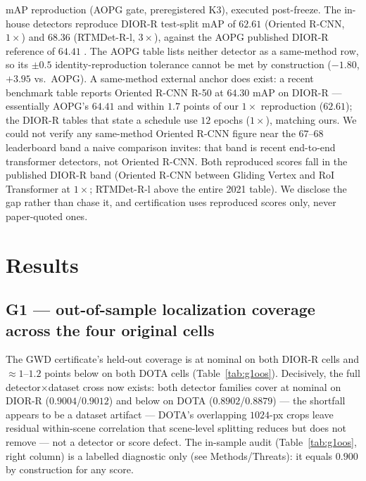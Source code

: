 \documentclass[11pt]{article}
\begin{document}
mAP reproduction (AOPG gate, preregistered K3), executed post-freeze. The in-house detectors reproduce
DIOR-R test-split mAP of $62.61$ (Oriented R-CNN, $1\times$) and $68.36$ (RTMDet-R-l, $3\times$), against the
AOPG published DIOR-R reference of $64.41$ \citep{cheng2022diorr}. The AOPG table lists neither detector as a
same-method row, so its $\pm0.5$ identity-reproduction tolerance cannot be met by construction ($-1.80$,
$+3.95$ vs.\ AOPG). A same-method external anchor does exist: a recent benchmark table reports Oriented R-CNN
R-50 at $64.30$ mAP on DIOR-R \citep{ding2026rtoriented} --- essentially AOPG's $64.41$ and within $1.7$ points
of our $1\times$ reproduction ($62.61$); the DIOR-R tables that state a schedule use $12$ epochs ($1\times$),
matching ours. We could not verify any same-method Oriented R-CNN figure near the $67$--$68$ leaderboard
band a naive comparison invites: that band is recent end-to-end transformer detectors, not Oriented R-CNN.
Both reproduced scores fall in the published DIOR-R band (Oriented R-CNN between Gliding Vertex and RoI
Transformer at $1\times$; RTMDet-R-l above the entire 2021 table). We disclose the gap rather than chase it,
and certification uses reproduced scores only, never paper-quoted ones.

\section{Results}\label{sec:results}
\subsection{G1 --- out-of-sample localization coverage across the four original cells}
The GWD certificate's held-out coverage is at nominal on both DIOR-R cells and $\approx1$--$1.2$ points below
on both DOTA cells (Table~\ref{tab:g1oos}). Decisively, the full detector$\times$dataset cross now exists:
both detector families cover at nominal on DIOR-R ($0.9004$/$0.9012$) and below on DOTA
($0.8902$/$0.8879$) --- the shortfall appears to be a dataset artifact --- DOTA's
overlapping $1024$-px crops leave residual within-scene correlation that scene-level splitting reduces but does
not remove --- not a detector or score defect. The in-sample audit (Table~\ref{tab:g1oos}, right column) is a
labelled diagnostic only (see Methods/Threats): it equals $0.900$ by construction for any score.
\end{document}
